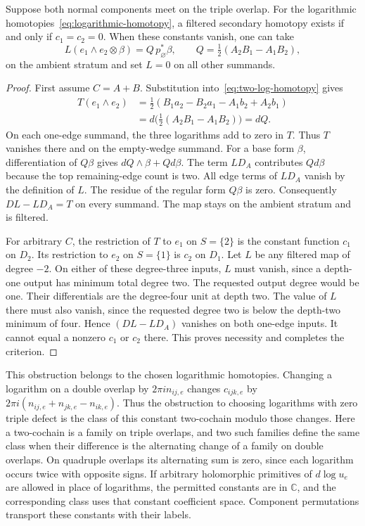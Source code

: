 \begin{theorem}
\label{thm:filtered-triple-criterion}
Suppose both normal components meet on the triple overlap.
For the logarithmic homotopies~\eqref{eq:logarithmic-homotopy},
a filtered secondary homotopy exists if and only if $c_1=c_2=0$.
When these constants vanish, one can take
\begin{equation}
\label{eq:secondary-log-homotopy}
L(e_1\wedge e_2\otimes\beta)
=Q\,p_\varnothing^*\beta,
\qquad
Q=\tfrac12(A_2B_1-A_1B_2),
\end{equation}
on the ambient stratum and set $L=0$ on all other summands.
\end{theorem}

\begin{proof}
First assume $C=A+B$.
Substitution into~\eqref{eq:two-log-homotopy} gives
\begin{align*}
T(e_1\wedge e_2)
&=\tfrac12(B_1a_2-B_2a_1-A_1b_2+A_2b_1)\\
&=d\bigl(\tfrac12(A_2B_1-A_1B_2)\bigr)=dQ.
\end{align*}
On each one-edge summand, the three logarithms add to zero in $T$.
Thus $T$ vanishes there and on the empty-wedge summand.
For a base form $\beta$, differentiation of $Q\beta$ gives $dQ\wedge\beta+Qd\beta$.
The term $LD_A$ contributes $Qd\beta$ because the top remaining-edge count is two.
All edge terms of $LD_A$ vanish by the definition of $L$.
The residue of the regular form $Q\beta$ is zero.
Consequently $DL-LD_A=T$ on every summand.
The map stays on the ambient stratum and is filtered.

For arbitrary $C$, the restriction of $T$ to $e_1$ on $S=\{2\}$ is the constant function $c_1$ on $D_2$.
Its restriction to $e_2$ on $S=\{1\}$ is $c_2$ on $D_1$.
Let $L$ be any filtered map of degree $-2$.
On either of these degree-three inputs, $L$ must vanish, since a depth-one output has minimum total degree two.
The requested output degree would be one.
Their differentials are the degree-four unit at depth two.
The value of $L$ there must also vanish, since the requested degree two is below the depth-two minimum of four.
Hence $(DL-LD_A)$ vanishes on both one-edge inputs.
It cannot equal a nonzero $c_1$ or $c_2$ there.
This proves necessity and completes the criterion.
\end{proof}

This obstruction belongs to the chosen logarithmic homotopies.
Changing a logarithm on a double overlap by $2\pi i n_{ij,e}$ changes
$c_{ijk,e}$ by
$2\pi i(n_{ij,e}+n_{jk,e}-n_{ik,e})$.
Thus the obstruction to choosing logarithms with zero triple defect is the class of this constant two-cochain modulo those changes.
Here a two-cochain is a family on triple overlaps,
and two such families define the same class when their difference is the alternating change of a family on double overlaps.
On quadruple overlaps its alternating sum is zero, since each logarithm occurs twice with opposite signs.
If arbitrary holomorphic primitives of $d\log u_e$ are allowed in place of logarithms,
the permitted constants are in $\mathbb C$, and the corresponding class uses that constant coefficient space.
Component permutations transport these constants with their labels.

